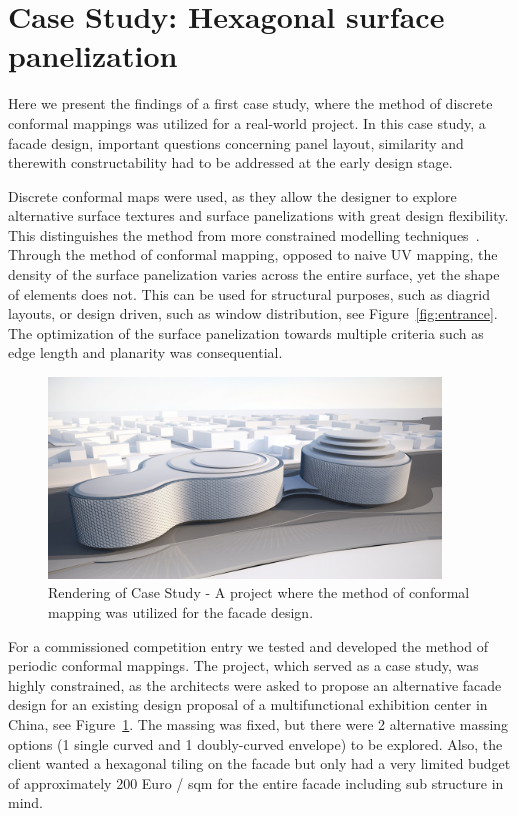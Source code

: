 \documentclass[article.tex]{subfiles}
\begin{document}
\section{Case Study: Hexagonal surface panelization}
\label{sec:panelization}
Here we present the findings of a first case study, where the method
of discrete conformal mappings was utilized for a real-world project.
In this case study, a facade design, important questions concerning
panel layout, similarity and therewith constructability had to be
addressed at the early design stage.

Discrete conformal maps were used, as they allow the designer to
explore alternative surface textures and surface panelizations with
great design flexibility. This distinguishes the method from more
constrained modelling techniques~\cite{Ceccato}. Through the method of
conformal mapping, opposed to naive UV mapping, the density of the
surface panelization varies across the entire surface, yet the shape
of elements does not. This can be used for structural purposes, such
as diagrid layouts, or design driven, such as window distribution, see 
Figure~\ref{fig:entrance}. The optimization of the surface panelization 
towards multiple criteria such as edge length and planarity was 
consequential.

\begin{figure}[t]
  \centering
  \includegraphics[width=0.93\textwidth]{images/henn/overview02.jpg}
  \caption{Rendering of Case Study - A project where the method of
    conformal mapping was utilized for the facade design.}
  \label{fig:overview02}
\end{figure}

For a commissioned competition entry we tested and developed the
method of periodic conformal mappings. The project, which served as a
case study, was highly constrained, as the architects were asked to
propose an alternative facade design for an existing design proposal
of a multifunctional exhibition center in China, see
Figure~\ref{fig:overview02}. The massing was fixed, but there were 2
alternative massing options (1 single curved and 1 doubly-curved
envelope) to be explored. Also, the client wanted a hexagonal tiling
on the facade but only had a very limited budget of approximately 200
Euro / sqm for the entire facade including sub structure in mind.
\end{document}
